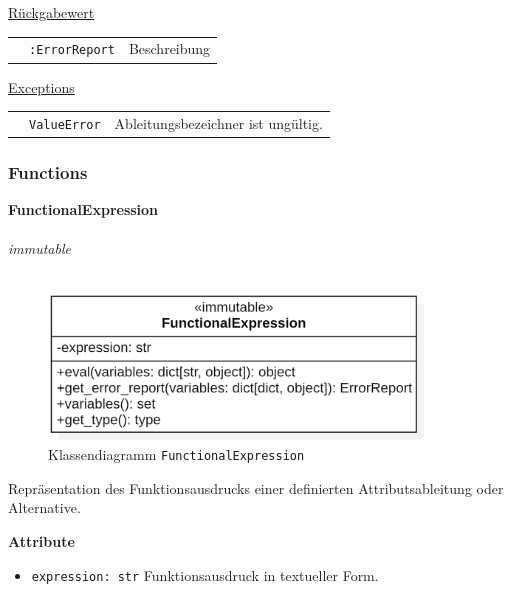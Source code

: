 \documentclass{article}
\begin{document}
\begin{itemize}
\underline{{Rückgabewert}}

\begin{tabular}{lll}
 & \texttt{:ErrorReport} & Beschreibung \\
\end{tabular}

\underline{Exceptions}\\
\begin{tabular}{lll}
 & \texttt{ValueError} & Ableitungsbezeichner ist ungültig.\\
\end{tabular}
\end{itemize}

\newpage
\subsubsection{Functions}
\textbf{\large{FunctionalExpression}}\\\\
\textit{\flqq{}immutable\frqq}\normalsize\\\\
\begin{figure}[H]%
    \centering
    \includegraphics[width=10cm]{entwurf/Entwurf_dokument/img/cls/model/FunctionalExpression.png}
    \caption{Klassendiagramm \texttt{FunctionalExpression}}
\end{figure}

Repräsentation des Funktionsausdrucks einer definierten Attributsableitung oder Alternative.
\newline \newline

\textbf{{Attribute}}
\begin{itemize}
\item \texttt{expression: str} \newline Funktionsausdruck in textueller Form.
\\\\
\end{itemize}
\end{document}

